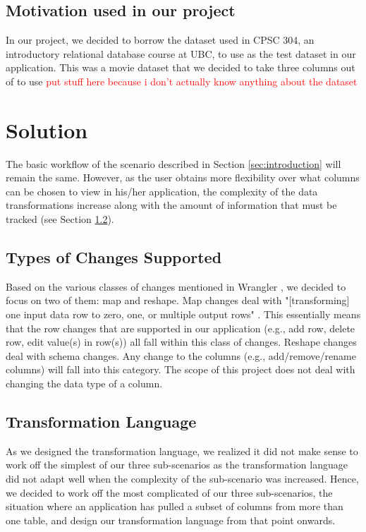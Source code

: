 \documentclass[12pt]{article}
\begin{document}
\subsection{Motivation used in our project}
In our project, we decided to borrow the dataset used in CPSC 304, an introductory relational database course at UBC, to use as the test dataset in our application. This was a movie dataset that we decided to take three columns out of to use \textcolor{red}{put stuff here because i don't actually know anything about the dataset}

\section{Solution}
The basic workflow of the scenario described in Section \ref{sec:introduction} will remain the same. However, as the user obtains more flexibility over what columns can be chosen to view in his/her application,  the complexity of the data transformations increase along with the amount of information that must be tracked (see Section \ref{sec:transformation_language}). 

\subsection{Types of Changes Supported}
Based on the various classes of changes mentioned in Wrangler \cite{kandel2011wrangler}, we decided to focus on two of them: map and reshape. Map changes deal with "[transforming] one input data row to zero, one, or multiple output rows" \cite{kandel2011wrangler}. This essentially means that the row changes that are supported in our application (e.g., add row, delete row, edit value(s) in row(s)) all fall within this class of changes. Reshape changes deal with schema changes. Any change to the columns (e.g., add/remove/rename columns) will fall into this category. The scope of this project does not deal with changing the data type of a column.

\subsection{Transformation Language}
\label{sec:transformation_language}
As we designed the transformation language, we realized it did not make sense to work off the simplest of our three sub-scenarios as the transformation language did not adapt well when the complexity of the sub-scenario was increased. Hence, we decided to work off the most complicated of our three sub-scenarios, the situation where an application has pulled a subset of columns from more than one table, and design our transformation language from that point onwards. 
\end{document}
